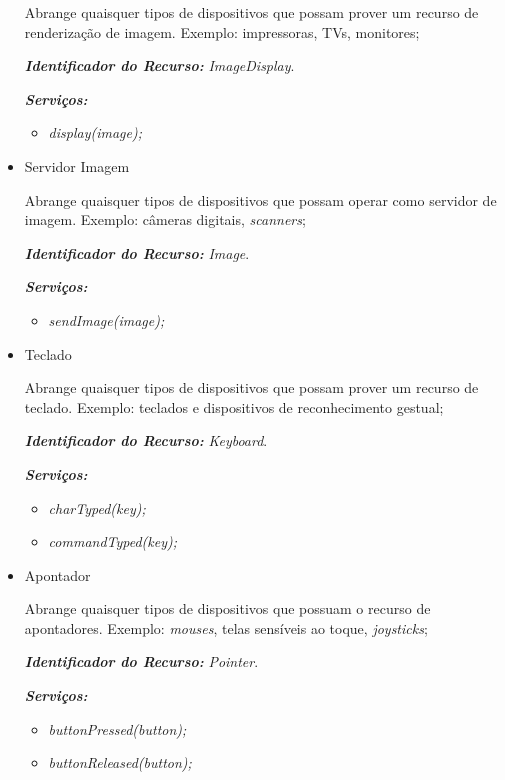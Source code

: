 \begin{itemize}
		Abrange quaisquer tipos de dispositivos que possam prover um recurso de renderização de imagem. Exemplo: impressoras, TVs, monitores;

		\emph{\bf{Identificador do Recurso:}} \emph{ImageDisplay}.

		\emph{\bf{Serviços:}} 
		\begin{itemize}
			\item \emph{display(image);}
		\end{itemize}

	\item Servidor Imagem
		
		Abrange quaisquer tipos de dispositivos que possam operar como servidor de imagem. Exemplo: câmeras digitais, \emph{scanners};

		\emph{\bf{Identificador do Recurso:}} \emph{Image}.

		\emph{\bf{Serviços:}} 
		\begin{itemize}
			\item \emph{sendImage(image);}
		\end{itemize}
	\item Teclado
		
		Abrange quaisquer tipos de dispositivos que possam prover um recurso de teclado. Exemplo: teclados e dispositivos de reconhecimento gestual;

		\emph{\bf{Identificador do Recurso:}} \emph{Keyboard}.

		\emph{\bf{Serviços:}} 
		\begin{itemize}
			\item \emph{charTyped(key);}
			\item \emph{commandTyped(key);}
		\end{itemize}

	\item Apontador
		
		Abrange quaisquer tipos de dispositivos que possuam o recurso de apontadores. Exemplo: \emph{mouses}, telas sensíveis ao toque, \emph{joysticks};

		\emph{\bf{Identificador do Recurso:}} \emph{Pointer}.

		\emph{\bf{Serviços:}} 
		\begin{itemize}
			\item \emph{buttonPressed(button);}
			\item \emph{buttonReleased(button);}
		\end{itemize}

\end{itemize}


